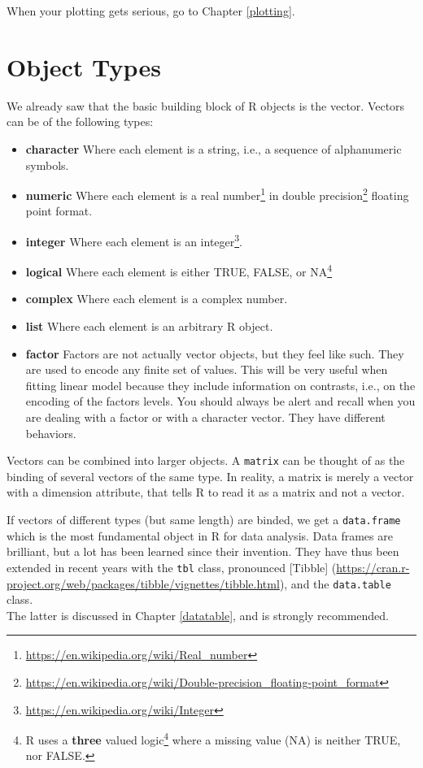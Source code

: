 \documentclass[]{book}
\providecommand{\tightlist}{%
  \setlength{\itemsep}{0pt}\setlength{\parskip}{0pt}}
\renewcommand{\href}[2]{#2\footnote{\url{#1}}}
\theoremstyle{definition}
\theoremstyle{definition}
\theoremstyle{definition}
\theoremstyle{remark}
\begin{document}
When your plotting gets serious, go to Chapter \ref{plotting}.

\hypertarget{object-types}{%
\section{Object Types}\label{object-types}}

We already saw that the basic building block of R objects is the vector.
Vectors can be of the following types:

\begin{itemize}
\tightlist
\item
  \textbf{character} Where each element is a string, i.e., a sequence of alphanumeric symbols.
\item
  \textbf{numeric} Where each element is a \href{https://en.wikipedia.org/wiki/Real_number}{real number} in \href{https://en.wikipedia.org/wiki/Double-precision_floating-point_format}{double precision} floating point format.
\item
  \textbf{integer} Where each element is an \href{https://en.wikipedia.org/wiki/Integer}{integer}.
\item
  \textbf{logical} Where each element is either TRUE, FALSE, or NA\footnote{R uses a \href{https://en.wikipedia.org/wiki/Three-valued_logic}{\textbf{three} valued logic} where a missing value (NA) is neither TRUE, nor FALSE.}
\item
  \textbf{complex} Where each element is a complex number.
\item
  \textbf{list} Where each element is an arbitrary R object.
\item
  \textbf{factor} Factors are not actually vector objects, but they feel like such.
  They are used to encode any finite set of values.
  This will be very useful when fitting linear model because they include information on contrasts, i.e., on the encoding of the factors levels.
  You should always be alert and recall when you are dealing with a factor or with a character vector. They have different behaviors.
\end{itemize}

Vectors can be combined into larger objects.
A \texttt{matrix} can be thought of as the binding of several vectors of the same type.
In reality, a matrix is merely a vector with a dimension attribute, that tells R to read it as a matrix and not a vector.

If vectors of different types (but same length) are binded, we get a \texttt{data.frame} which is the most fundamental object in R for data analysis.
Data frames are brilliant, but a lot has been learned since their invention.
They have thus been extended in recent years with the \texttt{tbl} class, pronounced {[}Tibble{]} (\url{https://cran.r-project.org/web/packages/tibble/vignettes/tibble.html}), and the \texttt{data.table} class.\\
The latter is discussed in Chapter \ref{datatable}, and is strongly recommended.
\end{document}
